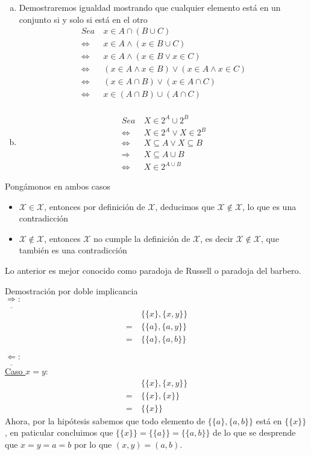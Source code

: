 \documentclass[dcc]{fcfmcourse}
\begin{document}
\begin{problems}
\begin{enumerate}[a)]
\item Demostraremos igualdad mostrando que cualquier elemento está en un conjunto si y solo si está en el otro
\begin{align*}
Sea\ & x \in A \cap (B \cup C) \\
\Leftrightarrow\ & x \in A \land (x \in B \cup C)\\
\Leftrightarrow\ & x \in A \land (x \in B \lor x\in C)\\
\Leftrightarrow\ & (x \in A \land x \in B) \lor ( x \in A \land x\in C)\\
\Leftrightarrow\ & (x \in A \cap B) \lor ( x \in A \cap C)\\
\Leftrightarrow\ & x \in (A \cap B) \cup (A \cap C)\\
\end{align*}
\item 
\begin{align*}
Sea\ & X \in 2^A \cup 2^B \\
\Leftrightarrow\ & X \in 2^A \lor X\in 2^B \\
\Leftrightarrow\ & X \subseteq A \lor X \subseteq B \\
\Rightarrow\ & X \subseteq A \cup B \\
\Leftrightarrow\ & X \in 2^{A \cup B}
\end{align*}
\end{enumerate}
\problem Pongámonos en ambos casos
\begin{itemize}
\item $\mathcal{X} \in \mathcal{X}$, entonces por definición de $\mathcal{X}$, deducimos que $\mathcal{X} \not\in \mathcal{X}$, lo que es una contradicción
\item $\mathcal{X} \not\in \mathcal{X}$, entonces $\mathcal{X}$ no cumple la definición de $\mathcal{X}$, es decir $\mathcal{X} \not\in \mathcal{X}$, que también es una contradicción
\end{itemize}
Lo anterior es mejor conocido como paradoja de Russell o paradoja del barbero.

\problem 
Demostración por doble implicancia\\

$\underline{\Rightarrow}:$ 
\begin{align*}
&\{\{x\}, \{x, y\}\}\\
=\ & \{\{a\}, \{a, y\}\}\\
=\ & \{\{a\}, \{a, b\}\}
\end{align*}


$\underline{\Leftarrow}:$ \\
\underline{Caso $x = y$}:
\begin{align*}
&\{\{x\}, \{x, y\}\}\\
=\ & \{\{x\}, \{x\}\}\\
=\ & \{\{x\}\}
\end{align*}
Ahora, por la hipótesis sabemos que todo elemento de $\{\{a\}, \{a, b\}\}$ está en $\{\{x\}\}$, en paticular concluimos que $\{\{x\}\} = \{\{a\}\} = \{\{a, b\}\}$ de lo que se desprende que $x=y=a=b$ por lo que $(x,y) = (a,b)$.\\


\end{problems}
\end{document}
